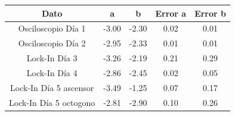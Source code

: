 \begin{tabular}{c|c|c|c|c}
\toprule
Dato & a & b & Error a & Error b \\
\midrule
Osciloscopio Día 1 & -3.00 & -2.30 & 0.02 & 0.01 \\
Osciloscopio Día 2 & -2.95 & -2.33 & 0.01 & 0.01 \\
Lock-In Día 3 & -3.26 & -2.19 & 0.21 & 0.29 \\
Lock-In Día 4 & -2.86 & -2.45 & 0.02 & 0.05 \\
Lock-In Día 5 ascensor & -3.49 & -1.25 & 0.07 & 0.17 \\
Lock-In Día 5 octogono & -2.81 & -2.90 & 0.10 & 0.26 \\
\bottomrule
\end{tabular}
